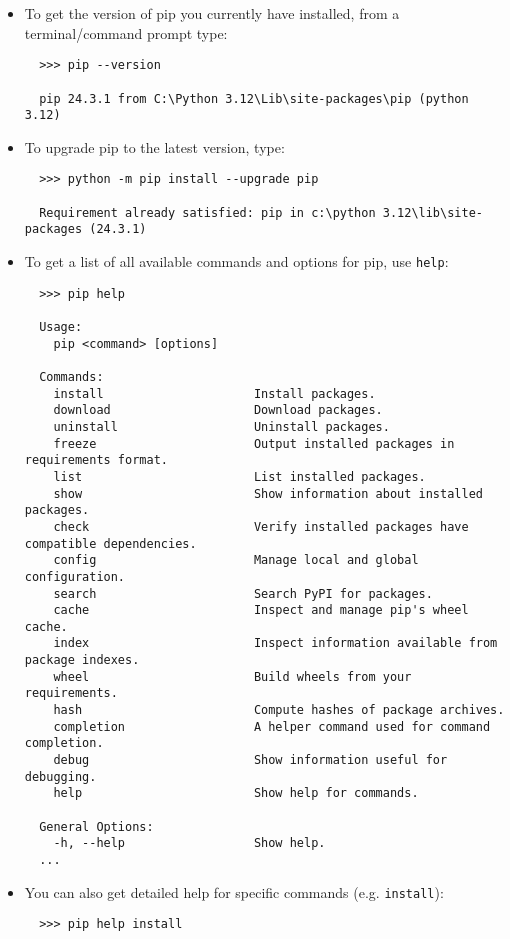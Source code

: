 \documentclass{UNB-Physics-Assignment}
\begin{document}
\begin{itemize}
\item To get the version of pip you currently have installed, from a terminal/command prompt type:
\begin{verbatim}
  >>> pip --version

  pip 24.3.1 from C:\Python 3.12\Lib\site-packages\pip (python 3.12)
\end{verbatim}

\item To upgrade pip to the latest version, type:
\begin{verbatim}
  >>> python -m pip install --upgrade pip

  Requirement already satisfied: pip in c:\python 3.12\lib\site-packages (24.3.1)
\end{verbatim}

\item To get a list of all available commands and options for pip, use \verb"help":
\begin{verbatim}
  >>> pip help

  Usage:
    pip <command> [options]

  Commands:
    install                     Install packages.
    download                    Download packages.
    uninstall                   Uninstall packages.
    freeze                      Output installed packages in requirements format.
    list                        List installed packages.
    show                        Show information about installed packages.
    check                       Verify installed packages have compatible dependencies.
    config                      Manage local and global configuration.
    search                      Search PyPI for packages.
    cache                       Inspect and manage pip's wheel cache.
    index                       Inspect information available from package indexes.
    wheel                       Build wheels from your requirements.
    hash                        Compute hashes of package archives.
    completion                  A helper command used for command completion.
    debug                       Show information useful for debugging.
    help                        Show help for commands.

  General Options:
    -h, --help                  Show help.
  ...
\end{verbatim}

\item You can also get detailed help for specific commands (e.g. \verb"install"):
\begin{verbatim}
  >>> pip help install


\end{verbatim}
\end{itemize}
\end{document}
